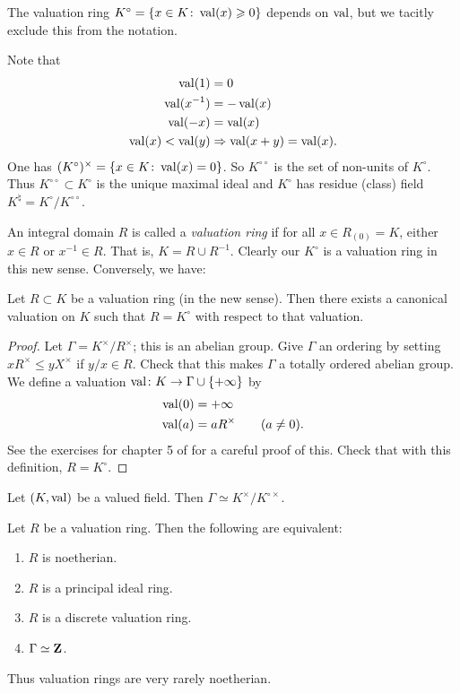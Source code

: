 The valuation ring $K^\circ=\{x\in K\colon \operatorname{val}(x)\geqslant 0\}$ depends 
on $\operatorname{val}$, but we tacitly exclude this from the notation. 

Note that 
\begin{align*}
  \operatorname{val}(1) &= 0 \\
  \operatorname{val}(x^{-1}) &= -\operatorname{val}(x) \\
  \operatorname{val}(-x) &= \operatorname{val}(x) \\
  \operatorname{val}(x) < \operatorname{val}(y) &\Rightarrow \operatorname{val}(x+y) = \operatorname{val}(x) .
\end{align*}
One has $(K^\circ)^\times = \{x\in K\colon \operatorname{val}(x)=0\}$. So 
$K^{\circ\circ}$ is the set of non-units of $K^\circ$. Thus 
$K^{\circ\circ}\subset K^\circ$ is the unique maximal ideal and $K^\circ$ has 
residue (class) field $K^\natural=K^\circ/K^{\circ\circ}$. 

An integral domain $R$ is called a \emph{valuation ring} if for all 
$x\in R_{(0)}=K$, either $x\in R$ or $x^{-1}\in R$. That is, 
$K=R\cup R^{-1}$. Clearly our $K^\circ$ is a valuation ring in this new
sense. Conversely, we have: 

\begin{lemma}
Let $R\subset K$ be a valuation ring (in the new sense). 
Then there exists a canonical valuation on $K$ such that $R=K^\circ$ with 
respect to that valuation. 
\end{lemma}
\begin{proof}
Let $\Gamma=K^\times/R^\times$; this is an abelian group. Give $\Gamma$ an 
ordering by setting $x R^\times \leqslant y X^\times$ if $y/x\in R$. Check 
that this makes $\Gamma$ a totally ordered abelian group. We define a valuation 
$\operatorname{val}\colon K\to \Gamma\cup\{+\infty\}$ by 
\begin{align*}
  \operatorname{val}(0) &= +\infty \\
  \operatorname{val}(a) &= a R^\times \qquad (a\ne 0) .
\end{align*}
See the exercises for chapter 5 of \cite{atiyah-macdonald} for a careful 
proof of this. Check that with this definition, $R=K^\circ$. 
\end{proof}

\begin{corollary}
Let $(K,\operatorname{val})$ be a valued field. Then 
$\Gamma\simeq K^\times/K^{\circ\times}$. 
\end{corollary}

\begin{example}
Let $R$ be a valuation ring. Then the following are equivalent:
\begin{enumerate}
\item
$R$ is noetherian.

\item
$R$ is a principal ideal ring. 

\item
$R$ is a discrete valuation ring.

\item
$\Gamma\simeq \mathbf{Z}$. 
\end{enumerate}
Thus valuation rings are very rarely noetherian. 
\end{example}

